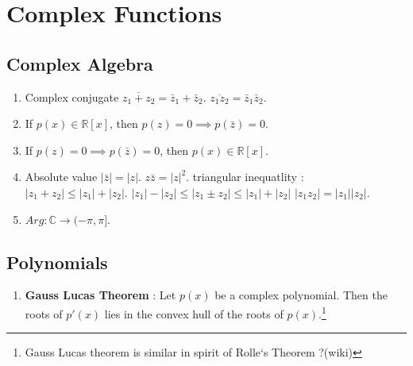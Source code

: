 \chapter{Complex Functions}
\section{Complex Algebra}
\begin{enumerate}
	\item Complex conjugate
		\subitem $\overline{z_1+z_2} = \bar{z}_1 + \bar{z}_2$.
		\subitem $\overline{z_1z_2} = \bar{z}_1 \bar{z}_2$.
	\item If $p(x) \in \mathbb{R}[x]$, then $p(z) = 0 \implies p(\bar{z}) = 0$.
	\item If $p(z) = 0 \implies p(\bar{z}) = 0$, then $p(x) \in \mathbb{R}[x]$.
	\item Absolute value
		\subitem $|\bar{z}| = |z|$.
		\subitem $z\bar{z} = |z|^2$.
		\subitem triangular inequatlity : $|z_1 + z_2 | \le |z_1| + |z_2|$.
		\subitem $|z_1| - |z_2| \le |z_1 \pm z_2| \le |z_1| + |z_2|$
		\subitem $|z_1z_2| = |z_1| |z_2|$.
	\item $Arg : \mathbb{C} \to (-\pi,\pi]$.
\end{enumerate}
\section{Polynomials}
\begin{enumerate}
	\item \textbf{Gauss Lucas Theorem} : Let $p(x)$ be a complex polynomial. Then the roots of $p'(x)$ lies in the convex hull of the roots of $p(x)$.\footnote{Gauss Lucas theorem is similar in spirit of Rolle`s Theorem ?(wiki)}
\end{enumerate}
